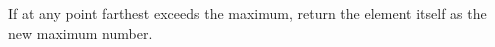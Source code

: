 \documentclass[preview]{standalone}
\begin{document}
If at any point farthest exceeds the maximum, return the element itself as the new maximum number.\\
\end{document}

